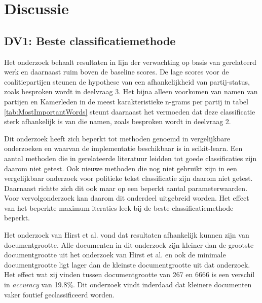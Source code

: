 \section{Discussie}
\subsection{DV1: Beste classificatiemethode}
Het onderzoek behaalt resultaten in lijn der verwachting op basis van gerelateerd werk en daarnaast ruim boven de baseline scores. De lage scores voor de coalitiepartijen steunen de hypothese van een afhankelijkheid van partij-status, zoals besproken wordt in deelvraag 3. Het bijna alleen voorkomen van namen van partijen en Kamerleden in de meest karakteristieke n-grams per partij in tabel \ref{tab:MostImportantWords} steunt daarnaast het vermoeden dat deze classificatie sterk afhankelijk is van die namen, zoals besproken wordt in deelvraag 2.\par
Dit onderzoek heeft zich beperkt tot methoden genoemd in vergelijkbare onderzoeken en waarvan de implementatie beschikbaar is in scikit-learn. Een aantal methoden die in gerelateerde literatuur leidden tot goede classificaties zijn daarom niet getest. Ook nieuwe methoden die nog niet gebruikt zijn in een vergelijkbaar onderzoek voor politieke tekst classificatie zijn daarom niet getest. Daarnaast richtte zich dit ook maar op een beperkt aantal parameterwaarden. Voor vervolgonderzoek kan daarom dit onderdeel uitgebreid worden. Het effect van het beperkte maximum iteraties leek bij de beste classificatiemethode beperkt.\par
Het onderzoek van Hirst et al. vond dat resultaten afhankelijk kunnen zijn van documentgrootte. Alle documenten in dit onderzoek zijn kleiner dan de grootste documentgrootte uit het onderzoek van Hirst et al. en ook de minimale documentgrootte ligt lager dan de kleinste documentgrootte uit dat onderzoek.
Het effect wat zij vinden tussen documentgrootte van 267 en 6666 is een verschil in \textit{accuracy} van 19.8\%. Dit onderzoek vindt inderdaad dat kleinere documenten vaker foutief geclassificeerd worden.
